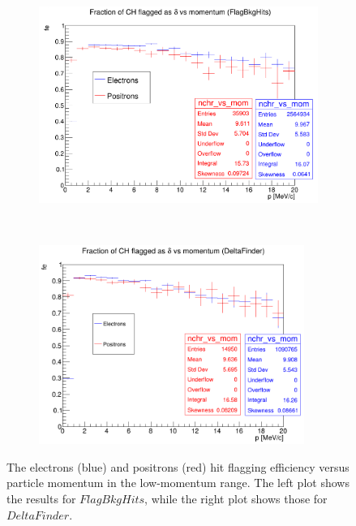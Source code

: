 \begin{figure}[!h]
    \centering
    \begin{subfigure}[t]{0.5\textwidth}
        \centering
        \includegraphics[width=1.\textwidth]{figures/png/Screenshot_20240818_155835.png}
        \caption{}
        \label{fig:eff1}
    \end{subfigure}%
    ~ 
    \begin{subfigure}[t]{0.5\textwidth}
        \centering
        \includegraphics[width=0.95\textwidth]{figures/png/Screenshot_20240813_203916.png}
        \caption{}
        \label{fig:eff2}
    \end{subfigure}
    \caption[The electrons (blue) and positrons (red) hit flagging efficiency versus 
    particle momentum in the low-momentum range.]{The electrons 
    (blue) and positrons (red) hit flagging efficiency versus 
    particle momentum in the low-momentum range. The left plot shows the 
    results for $FlagBkgHits$, while the right plot shows those for $DeltaFinder$.
    }
    \label{fig:efficiency}
  \end{figure} 

